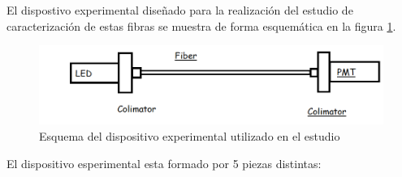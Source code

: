 El dispostivo experimental diseñado para la realización del estudio de caracterización de estas fibras se muestra de forma esquemática en la figura \ref{esquemasetup}.

\begin{figure}[H]
\centering
\includegraphics[scale=0.45]{Figuras/Set_up.png}
\caption{Esquema del dispositivo experimental utilizado en el estudio\label{esquemasetup}}
\end{figure}

El dispositivo esperimental esta formado por 5 piezas distintas:
